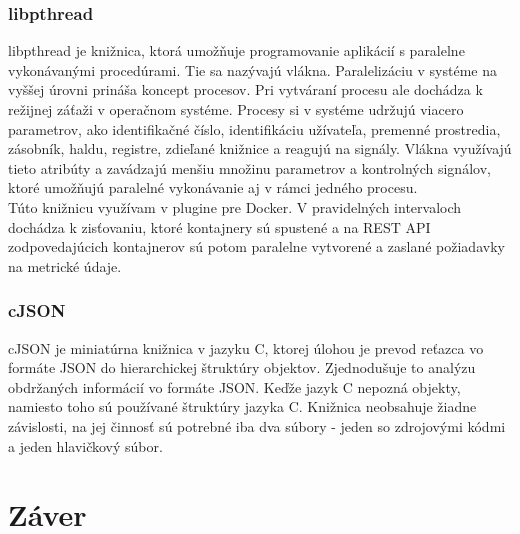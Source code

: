 \documentclass[printed,11pt,twoside,color,cover,table]{fithesis3}
\begin{document}
\subsection{libpthread}
libpthread je knižnica, ktorá umožňuje programovanie aplikácií s paralelne vykonávanými procedúrami. Tie sa nazývajú vlákna. Paralelizáciu
v systéme na vyššej úrovni prináša koncept procesov. Pri
vytváraní procesu ale dochádza k režijnej záťaži v operačnom systéme. Procesy si v systéme udržujú viacero parametrov, ako identifikačné
číslo, identifikáciu užívateľa, premenné prostredia, zásobník, haldu, registre, zdieľané knižnice a reagujú na signály. Vlákna využívajú
tieto atribúty a zavádzajú menšiu množinu parametrov a kontrolných signálov, ktoré umožňujú paralelné vykonávanie aj v rámci jedného procesu.
\\Túto knižnicu využívam v plugine pre Docker. V pravidelných intervaloch dochádza k zisťovaniu, ktoré kontajnery sú spustené a na REST API
zodpovedajúcich kontajnerov sú potom paralelne vytvorené a zaslané požiadavky na metrické údaje.

\subsection{cJSON}
cJSON je miniatúrna knižnica v jazyku C, ktorej úlohou je prevod reťazca vo formáte JSON do hierarchickej štruktúry objektov. Zjednodušuje
to analýzu obdržaných informácií vo formáte JSON. Keďže jazyk C nepozná objekty, namiesto toho sú používané štruktúry jazyka C. 
Knižnica neobsahuje žiadne závislosti, na jej činnosť sú potrebné iba dva súbory - jeden so zdrojovými kódmi a jeden hlavičkový súbor.

\chapter{Záver}

\printbibliography[heading=bibintoc]
\end{document}
